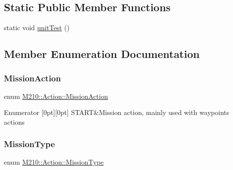 \subsection*{Static Public Member Functions}
\begin{DoxyCompactItemize}
\item 
static void \mbox{\hyperlink{class_m210_1_1_action_ac60580623e0519acbada490342fc8f0b}{unit\+Test}} ()
\end{DoxyCompactItemize}


\subsection{Member Enumeration Documentation}
\mbox{\label{class_m210_1_1_action_a0bb36f0932c930e1193428e3c3c98046}} 
\subsubsection{\texorpdfstring{Mission\+Action}{MissionAction}}
{\footnotesize\ttfamily enum \mbox{\hyperlink{class_m210_1_1_action_a0bb36f0932c930e1193428e3c3c98046}{M210\+::\+Action\+::\+Mission\+Action}}}

\begin{DoxyEnumFields}{Enumerator}
[0pt][0pt]{}\mbox{\label{class_m210_1_1_action_a0bb36f0932c930e1193428e3c3c98046ae9c51def583033613d398c85a26e927a}} 
S\+T\+A\+RT&Mission action, mainly used with waypoints actions \\
\hline

\end{DoxyEnumFields}
\mbox{\label{class_m210_1_1_action_ad9730775da7e3f099bef4571100e2f5d}} 
\subsubsection{\texorpdfstring{Mission\+Type}{MissionType}}
{\footnotesize\ttfamily enum \mbox{\hyperlink{class_m210_1_1_action_ad9730775da7e3f099bef4571100e2f5d}{M210\+::\+Action\+::\+Mission\+Type}}}

